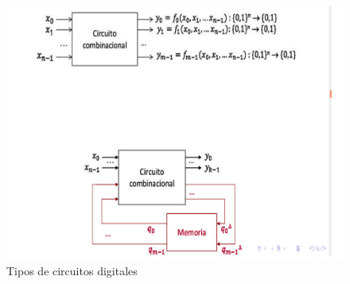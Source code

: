 \documentclass[12pt,letterpaper]{book}
\begin{document}
\begin{figure}[H]
\centering
\includegraphics[width=1\linewidth]{figures/cirDig1.png}
\caption{Tipos de circuitos digitales}
\label{cirDig1}
\end{figure}
\vspace{0.2cm}
\end{document}

